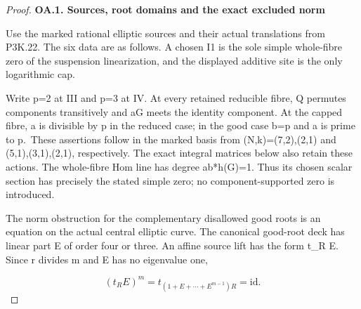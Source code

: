 \begin{proof}
\par

\medskip\noindent\textbf{OA.1. Sources, root domains and the exact excluded norm}

Use the marked rational elliptic sources and their actual translations
from P3K.22. The six data are as follows. A chosen I1 is the sole
simple whole-fibre zero of the suspension linearization, and the
displayed additive site is the only logarithmic cap.

\par{}\par\medskip

Write p=2 at III and p=3 at IV. At every retained reducible fibre,
Q permutes components transitively and aG meets the identity
component. At the capped fibre, a is divisible by p in the reduced
case; in the good case b=p and a is prime to p.~These assertions
follow in the marked basis from (N,k)=(7,2),(2,1) and
(5,1),(3,1),(2,1), respectively. The exact integral matrices below
also retain these actions. The whole-fibre Hom line has degree
ab*h(G)=1. Thus its chosen scalar section has precisely the stated
simple zero; no component-supported zero is introduced.

The norm obstruction for the complementary disallowed good roots
is an equation on the actual central elliptic curve. The canonical
good-root deck has linear part E of order four or three. An affine
source lift has the form t\_R E. Since r divides m and E has no
eigenvalue one,

\[
(t_R E)^m=t_{(1+E+\cdots+E^{m-1})R}=\mathrm{id}.
\]


\end{proof}
